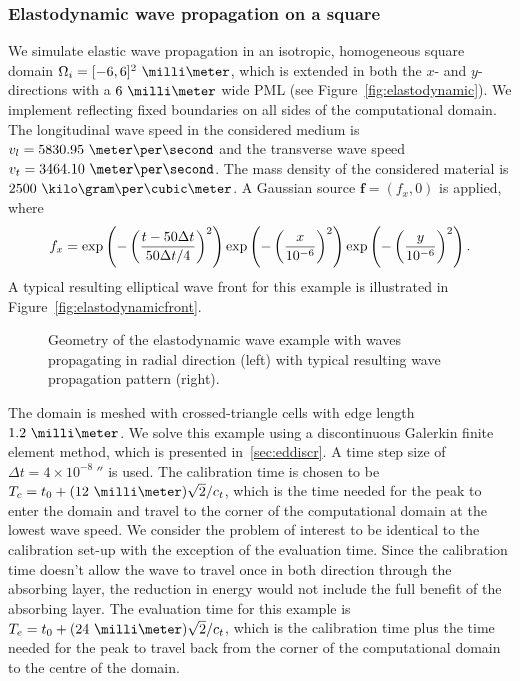 \documentclass[a4paper]{article}
\renewcommand{\vec}{\boldsymbol}
\begin{document}
\subsubsection{Elastodynamic wave propagation on a square}
\label{sec:elastoresultspml}

We simulate elastic wave propagation in an isotropic, homogeneous
square domain $\Omega_{i} = [-6, 6]^{2}~\milli\meter$, which is
extended in both the $x$- and $y$-directions with a $6~\milli\meter$
wide PML (see Figure~\ref{fig:elastodynamic}). We implement reflecting
fixed boundaries on all sides of the computational domain. The
longitudinal wave speed in the considered medium is $v_{l} =
5830.95~\meter\per \second$ and the transverse wave speed~$v_{t} =
3464.10~\meter\per \second$. The mass density of the considered
material is $2500~\kilo\gram\per\cubic\meter$. A Gaussian source
$\vec{f} = (f_{x}, 0)$ is applied, where
\begin{equation}
  f_{x} =
  \exp\del{-\del{\frac{t - 50 \Delta t}{50 \Delta t/4}}^{2}}
  \exp\del{-\del{\frac{x}{10^{-6}}}^{2}}
  \exp\del{-\del{\frac{y}{10^{-6}}}^{2}}.
\end{equation}
A typical resulting elliptical wave front for this example is
illustrated in Figure~\ref{fig:elastodynamicfront}.
\begin{figure}
  \centering
  \hfil
  \caption{Geometry of the elastodynamic wave example with waves
    propagating in radial direction (left) with typical resulting wave
    propagation pattern (right).}
\end{figure}

The domain is meshed with crossed-triangle cells with edge length
$1.2~\milli\meter$. We solve this example using a discontinuous
Galerkin finite element method, which is presented
in~\ref{sec:eddiscr}. A time step size of $\Delta t = 4 \times
10^{-8}~\second$ is used. The calibration time is chosen to be $T_{c}
= t_0 + (12~\milli\meter)\sqrt{2}/c_t$, which is the time needed for
the peak to enter the domain and travel to the corner of the
computational domain at the lowest wave speed.
We consider the problem of interest to be identical to the calibration set-up
with the exception of the evaluation time. Since the calibration time doesn't
allow the wave to travel once in both direction through the absorbing layer,
the reduction in energy would not include the full benefit of the absorbing
layer. The evaluation time for this example is $T_{e} = t_0 +
(24~\milli\meter)\sqrt{2}/c_{t}$, which is the calibration time plus
the time needed for the peak to travel back from the corner of the
computational domain to the centre of the domain.
\end{document}
